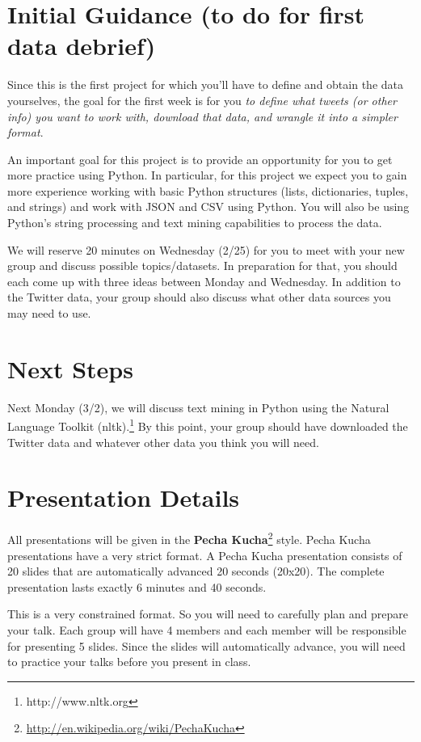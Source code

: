 \documentclass[11pt, oneside]{article}   	%
\begin{document}
\section{Initial Guidance (to do for first data debrief)}

Since this is the first project for which you'll have to define and obtain the
data yourselves, the goal for the first week is for you \emph{to define what
tweets (or other info) you want to work with, download that data, and wrangle
it into a simpler format}. 

An important goal for this project is to provide an opportunity for you to
get more practice using Python.  In particular, for this project we expect
you to gain more experience working with basic Python structures (lists,
dictionaries, tuples, and strings) and work with JSON and CSV using Python.
You will also be using Python's string processing and text mining capabilities
to process the data.

We will reserve 20 minutes on Wednesday (2/25) for you to meet with your new
group and discuss possible topics/datasets. In preparation for that, you should
each come up with three ideas between Monday and Wednesday.  In addition to
the Twitter data, your group should also discuss what other data sources
you may need to use.

\section{Next Steps}

Next Monday (3/2), we will discuss text mining in Python using the Natural
Language Toolkit (nltk).\footnote{http://www.nltk.org} By this point, your
group should have downloaded the Twitter data and whatever other data you
think you will need.  

\section{Presentation Details}

All presentations will be given in the \textbf{Pecha
Kucha}\footnote{\url{http://en.wikipedia.org/wiki/PechaKucha}} style.  Pecha
Kucha presentations have a very strict format.  A Pecha Kucha presentation
consists of 20 slides that are automatically advanced 20 seconds (20x20).  The
complete presentation lasts exactly 6 minutes and 40 seconds.

This is a very constrained format.  So you will need to carefully plan and
prepare your talk.  Each group will have 4 members and each member will
be responsible for presenting 5 slides.  Since the slides will automatically
advance, you will need to practice your talks before you present in class.
\end{document}
